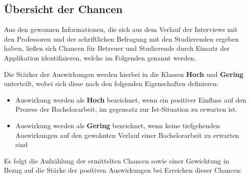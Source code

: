 \documentclass[bibliography=totoc,listof=totoc,BCOR=5mm,DIV=12,oneside]{scrbook}
\begin{document}
\newpage
\subsection{Übersicht der Chancen} \label{sub:chancenuebersicht}
\par Aus den gewonnen Informationen, die sich aus dem Verlauf der Interviews mit den Professoren und der schriftlichen Befragung mit den Studierenden ergeben haben, ließen sich Chancen für Betreuer und Studierende durch Einsatz der Applikation identifizieren, welche im Folgenden genannt werden.

\par \bigskip Die Stärker der Auswirkungen werden hierbei in die Klassen \textbf{Hoch} und \textbf{Gering} unterteilt, wobei sich diese nach den folgenden Eigenschaften definieren:

\begin{itemize}
\item Auswirkung werden als \textbf{Hoch} bezeichnet, wenn ein positiver Einfluss auf den Prozess der Bachelorarbeit, im gegensatz zur Ist-Situation zu erwarten ist.

\item Auswirkung werden als \textbf{Gering} bezeichnet, wenn keine tiefgehenden Auswirkungen auf den gewohnten Verlauf einer Bachelorarbeit zu erwarten sind
\end{itemize}

\par  Es folgt die Aufzählung der ermittelten Chancen sowie einer Gewichtung in Bezug auf die Stärke der positiven Auswirkungen bei Erreichen dieser Chancen:
\end{document}
